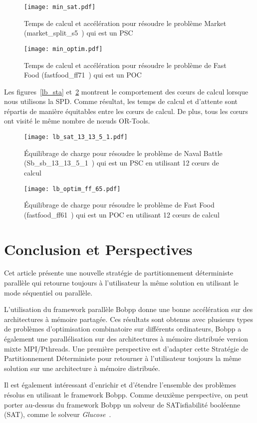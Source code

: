 \documentclass[parallelisme]{compas2014}
\begin{document}
\begin{figure}[htbp]
\begin{minipage}[c]{.45\linewidth}
\texttt{[image: min\_sat.pdf]}
\caption {Temps de calcul et accélération pour résoudre le problème Market (market\_split\_s5~\cite{ch2012}) qui est un PSC} \label{min_sta}
\end{minipage}
\hfill
\begin{minipage}[c]{.45\linewidth}
\texttt{[image: min\_optim.pdf]}
\caption {Temps de calcul et accélération pour résoudre le problème de Fast Food (fastfood\_ff71~\cite{ch2012}) qui est un POC} \label{min_optim}
\end{minipage}
\end{figure}

Les figures~\ref{lb_sta} et~\ref{lb_optim} montrent le comportement des cœurs de calcul lorsque nous utilisons la SPD. Comme résultat, les temps de calcul et d'attente sont répartis de manière équitables entre les cœurs de calcul. De plus, tous les cœurs ont visité le même nombre de nœuds OR-Tools.

\begin{figure}[htbp]
\begin{minipage}[c]{.45\linewidth}
\texttt{[image: lb\_sat\_13\_13\_5\_1.pdf]}
\caption {Équilibrage de charge pour résoudre le problème de Naval Battle (Sb\_sb\_13\_13\_5\_1~\cite{ch2012}) qui est un PSC en utilisant 12 cœurs de calcul} \label{lb_sta}
\end{minipage}
\hfill
\begin{minipage}[c]{.45\linewidth}
\texttt{[image: lb\_optim\_ff\_65.pdf]}
\caption {Équilibrage de charge pour résoudre le problème de Fast Food (fastfood\_ff61~\cite{ch2012}) qui est un POC en utilisant 12 cœurs de calcul} \label{lb_optim}
\end{minipage}
\end{figure}
\section{Conclusion et Perspectives}\label{conclusion}
Cet article présente une nouvelle stratégie de partitionnement déterministe parallèle qui retourne toujours à l'utilisateur la même solution en utilisant le mode séquentiel ou parallèle.

L'utilisation du framework parallèle Bobpp donne une bonne accélération sur des architectures à mémoire partagée. Ces résultats sont obtenus avec plusieurs types de problèmes d'optimisation combinatoire sur différents ordinateurs, Bobpp a également une parallélisation sur des architectures à mémoire distribuée version mixte MPI/Pthreads. Une première perspective est d'adapter cette Stratégie de Partitionnement Déterministe pour retourner à l'utilisateur toujours la même solution sur une architecture à mémoire distribuée.

Il est également intéressant d'enrichir et d'étendre l'ensemble des problèmes résolus en utilisant le framework Bobpp. Comme deuxième perspective, on peut porter au-dessus du framework Bobpp un solveur de SATisfiabilité booléenne (SAT), comme le solveur \textit{Glucose}~\cite{glucose}.




\end{document}
